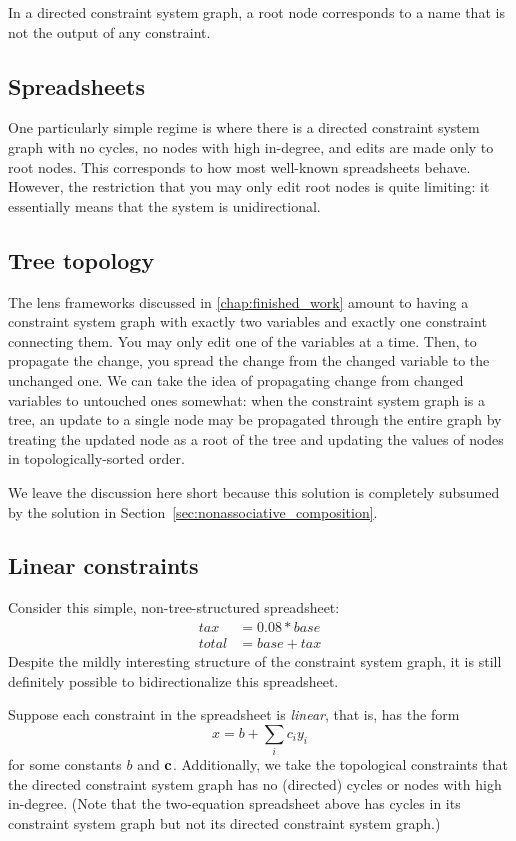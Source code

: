 In a directed constraint system graph, a root node corresponds to a name
that is not the output of any constraint.

\subsection{Spreadsheets}
One particularly simple regime is where there is a directed constraint
system graph with no cycles, no nodes with high in-degree, and edits are
made only to root nodes. This corresponds to how most well-known
spreadsheets behave. However, the restriction that you may only edit root
nodes is quite limiting: it essentially means that the system is
unidirectional.

\subsection{Tree topology}
The lens frameworks discussed in \ref{chap:finished_work} amount to having a
constraint system graph with exactly two variables and exactly one
constraint connecting them. You may only edit one of the variables at a
time. Then, to propagate the change, you spread the change from the changed
variable to the unchanged one.
%
We can take the idea of propagating change from changed variables to
untouched ones somewhat: when the constraint system graph is a tree, an
update to a single node may be propagated through the entire graph by
treating the updated node as a root of the tree and updating the values of
nodes in topologically-sorted order.

We leave the discussion here short because this solution is completely
subsumed by the solution in Section~\ref{sec:nonassociative_composition}.

\subsection{Linear constraints}
\label{sec:linear_constraints}
Consider this simple, non-tree-structured spreadsheet:
\begin{align*}
    tax &= 0.08*base \\
    total &= base + tax
\end{align*}
Despite the mildly interesting structure of the constraint system graph, it
is still definitely possible to bidirectionalize this spreadsheet.

Suppose each constraint in the spreadsheet is \emph{linear}, that is, has
the form
\[x = b+\sum_ic_iy_i\]
for some constants $b$ and $\bf c$. Additionally, we take the topological
constraints that the directed constraint system graph has no (directed)
cycles or nodes with high in-degree. (Note that the two-equation spreadsheet
above has cycles in its constraint system graph but not its directed
constraint system graph.)

